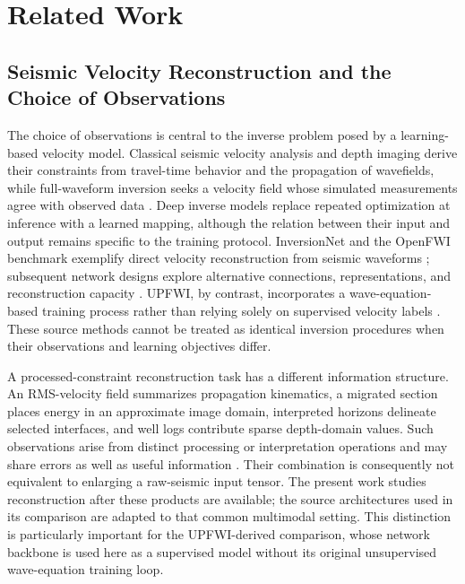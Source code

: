 \section{Related Work}

\subsection{Seismic Velocity Reconstruction and the Choice of Observations}

The choice of observations is central to the inverse problem posed by a learning-based velocity model. Classical seismic velocity analysis and depth imaging derive their constraints from travel-time behavior and the propagation of wavefields, while full-waveform inversion seeks a velocity field whose simulated measurements agree with observed data \citep{dix1955velocities,stolt1978migration,pratt1998gaussnewton,virieux2009overview}. Deep inverse models replace repeated optimization at inference with a learned mapping, although the relation between their input and output remains specific to the training protocol. InversionNet and the OpenFWI benchmark exemplify direct velocity reconstruction from seismic waveforms \citep{wu2020inversionnet,deng2022openfwi}; subsequent network designs explore alternative connections, representations, and reconstruction capacity \citep{najafi2025svinvnet}. UPFWI, by contrast, incorporates a wave-equation-based training process rather than relying solely on supervised velocity labels \citep{jin2022upfwi}. These source methods cannot be treated as identical inversion procedures when their observations and learning objectives differ.

A processed-constraint reconstruction task has a different information structure. An RMS-velocity field summarizes propagation kinematics, a migrated section places energy in an approximate image domain, interpreted horizons delineate selected interfaces, and well logs contribute sparse depth-domain values. Such observations arise from distinct processing or interpretation operations and may share errors as well as useful information \citep{hampson2001multiattribute}. Their combination is consequently not equivalent to enlarging a raw-seismic input tensor. The present work studies reconstruction after these products are available; the source architectures used in its comparison are adapted to that common multimodal setting. This distinction is particularly important for the UPFWI-derived comparison, whose network backbone is used here as a supervised model without its original unsupervised wave-equation training loop.

